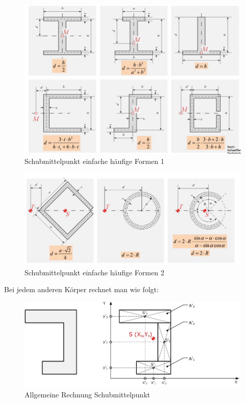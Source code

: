 \begin{figure}[h]
	\centering
	\includegraphics[scale=0.7]{Schubmittelpunk_1.jpg}
	\caption{Schubmittelpunkt einfache häufige Formen 1}
\end{figure}

\begin{figure}[h]
	\centering
	\includegraphics[scale=0.7]{Schubmittelpunk_2.jpg}
	\caption{Schubmittelpunkt einfache häufige Formen 2}
\end{figure}

\newpage

Bei jedem anderen Körper rechnet man wie folgt:

\begin{figure}[h]
	\centering
	\includegraphics[scale=0.7]{Schubmittelpunk_Rechnung.jpg}
	\caption{Allgemeine Rechnung Schubmittelpunkt}
\end{figure}

